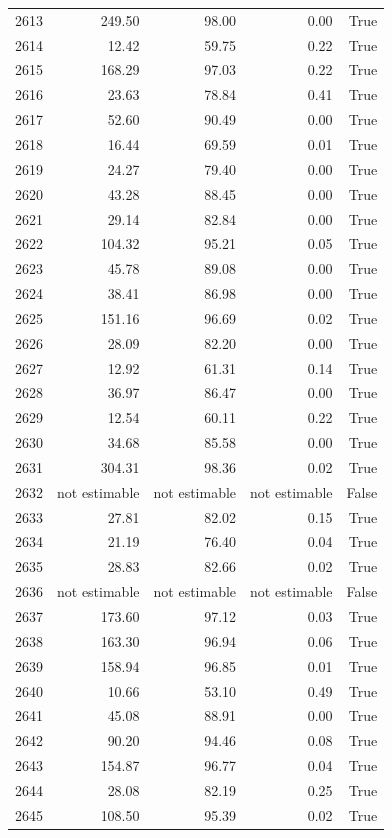 \begin{longtable}{rrrrr}
2613 & 249.50 & 98.00 & 0.00 & True \\
2614 & 12.42 & 59.75 & 0.22 & True \\
2615 & 168.29 & 97.03 & 0.22 & True \\
2616 & 23.63 & 78.84 & 0.41 & True \\
2617 & 52.60 & 90.49 & 0.00 & True \\
2618 & 16.44 & 69.59 & 0.01 & True \\
2619 & 24.27 & 79.40 & 0.00 & True \\
2620 & 43.28 & 88.45 & 0.00 & True \\
2621 & 29.14 & 82.84 & 0.00 & True \\
2622 & 104.32 & 95.21 & 0.05 & True \\
2623 & 45.78 & 89.08 & 0.00 & True \\
2624 & 38.41 & 86.98 & 0.00 & True \\
2625 & 151.16 & 96.69 & 0.02 & True \\
2626 & 28.09 & 82.20 & 0.00 & True \\
2627 & 12.92 & 61.31 & 0.14 & True \\
2628 & 36.97 & 86.47 & 0.00 & True \\
2629 & 12.54 & 60.11 & 0.22 & True \\
2630 & 34.68 & 85.58 & 0.00 & True \\
2631 & 304.31 & 98.36 & 0.02 & True \\
2632 & not estimable & not estimable & not estimable & False \\
2633 & 27.81 & 82.02 & 0.15 & True \\
2634 & 21.19 & 76.40 & 0.04 & True \\
2635 & 28.83 & 82.66 & 0.02 & True \\
2636 & not estimable & not estimable & not estimable & False \\
2637 & 173.60 & 97.12 & 0.03 & True \\
2638 & 163.30 & 96.94 & 0.06 & True \\
2639 & 158.94 & 96.85 & 0.01 & True \\
2640 & 10.66 & 53.10 & 0.49 & True \\
2641 & 45.08 & 88.91 & 0.00 & True \\
2642 & 90.20 & 94.46 & 0.08 & True \\
2643 & 154.87 & 96.77 & 0.04 & True \\
2644 & 28.08 & 82.19 & 0.25 & True \\
2645 & 108.50 & 95.39 & 0.02 & True \\

\end{longtable}
